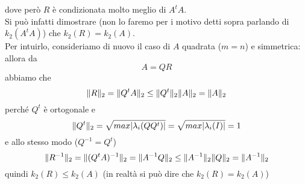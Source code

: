 \documentclass[12pt,a4paper]{article}
\DeclarePairedDelimiter{\norma}{\lVert}{\rVert}
\begin{document}
dove però $R$ è condizionata molto meglio di $A^tA$. \\
Si può infatti dimostrare (non lo faremo per i motivo detti sopra parlando di $k_2(A^tA)$) che $k_2(R)=k_2(A)$. \\
Per intuirlo, consideriamo di nuovo il caso di $A$ quadrata ($m=n$) e simmetrica: allora da
\begin{equation*}
    A=QR
\end{equation*}
abbiamo che
\begin{equation*}
    \norma{R}_2 = \norma{Q^tA}_2 \leq \norma{Q^t}_2\norma{A}_2 = \norma{A}_2
\end{equation*}
perché $Q^t$ è ortogonale e 
\begin{equation*}
    \norma{Q^t}_2=\sqrt{max|\lambda_i(QQ^t)|}=\sqrt{max|\lambda_i(I)|}=1
\end{equation*}
e allo stesso modo ($Q^{-1}=Q^t$)
\begin{equation*}
    \norma{R^{-1}}_2 = \norma{(Q^tA)^{-1}}_2=\norma{A^{-1}Q}_2 \leq \norma{A^{-1}}_2\norma{Q}_2 = \norma{A^{-1}}_2 
\end{equation*}
quindi $k_2(R)\leq k_2(A)$ (in realtà si può dire che $k_2(R)=k_2(A)$)
\end{document}
